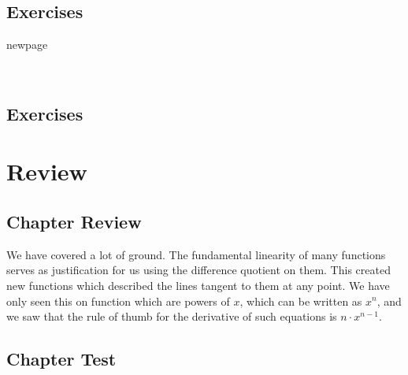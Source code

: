 \subsection{Exercises}
\noindent{}
newpage
\noindent{}
\newpage
\noindent{}
\newpage
\noindent{}




{}
\noindent{}
\newpage

~\vfill
\subsection{Exercises}
\noindent{}
\newpage
\noindent{}
\newpage
\noindent{}





\newpage

\section{Review}
\subsection{Chapter Review}
We have covered a lot of ground.  The fundamental linearity of many functions serves
as justification for us using the difference quotient on them.  This created new functions which 
described the lines tangent to them at any point.  We have only seen this on function which are
powers of $x$, which can be written as $x^n$, and we saw that the rule of thumb for the
derivative of such equations is $n\cdot x^{n-1}$.
\subsection{Chapter Test}


